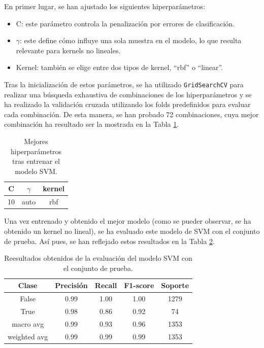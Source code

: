 \documentclass[12pt,letterpaper]{article}
\begin{document}
En primer lugar, se han ajustado los siguientes hiperparámetros:
\begin{itemize}
    \item C: este parámetro controla la penalización por errores de clasificación.
    \item $\gamma$: este define cómo influye una sola muestra en el modelo, lo que resulta relevante para kernels no lineales.
    \item Kernel: también se elige entre dos tipos de kernel, ``rbf'' o ``linear''.
\end{itemize}

Tras la inicialización de estos parámetros, se ha utilizado \texttt{GridSearchCV} para realizar una búsqueda exhaustiva de combinaciones de los hiperparámetros y se ha realizado la validación cruzada utilizando los folds predefinidos para evaluar cada combinación. De esta manera, se han probado 72 combinaciones, cuya mejor combinación ha resultado ser la mostrada en la Tabla \ref{tab:hiper-SVM}.
\begin{table}[H]
    \centering
    \begin{tabular}{|c|c|c|}
     \hline
     C & $\gamma$ & kernel \\ \hline
     10 & auto & rbf \\ \hline
    \end{tabular}
    \caption{Mejores hiperparámetros tras entrenar el modelo SVM.}
    \label{tab:hiper-SVM}
\end{table}

Una vez entrenado y obtenido el mejor modelo (como se pueder observar, se ha obtenido un kernel no lineal), se ha evaluado este modelo de SVM con el conjunto de prueba. Así pues, se han reflejado estos resultados en la Tabla \ref{tab:res-SVM}.
\begin{table}[H]
    \centering
    \begin{tabular}{|c|c|c|c|c|}
    \hline
    Clase & Precisión & Recall & F1-score & Soporte \\ \hline \hline
    False & 0.99 & 1.00 & 1.00 & 1279 \\ \hline
    True & 0.98 &  0.86 & 0.92 & 74 \\ \hline
    macro avg & 0.99 & 0.93 & 0.96 & 1353 \\ \hline
    weighted avg & 0.99 &  0.99 & 0.99 & 1353 \\ \hline
    \end{tabular}
    \caption{Reesultados obtenidos de la evaluación del modelo SVM con el conjunto de prueba.}
    \label{tab:res-SVM}
\end{table}
\end{document}
